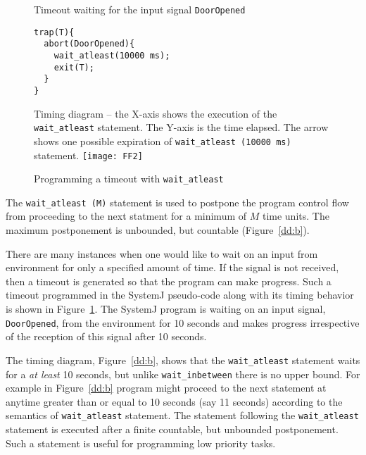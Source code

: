 \begin{figure}[b!]
	\centering
	\vspace{-10pt}
        \begin{SubFloat}{\label{dd:a}Timeout waiting for the input
            signal \texttt{DoorOpened}}
        \begin{lstlisting}[style=sysj,morekeywords={abort,await,emit,present,trap,pause,exit,wait_atleast,suspend}]
trap(T){
  abort(DoorOpened){
    wait_atleast(10000 ms);
    exit(T);  
  }
}
\end{lstlisting}
\end{SubFloat}
\begin{SubFloat}{\label{dd:b}Timing diagram -- the X-axis shows the
    execution of the \texttt{wait\_atleast} statement. The Y-axis is the
    time elapsed. The arrow shows one possible expiration of
    \texttt{wait\_atleast (10000 ms)} statement.}
\texttt{[image: FF2]}
\end{SubFloat}
\caption{Programming a timeout with \texttt{wait\_atleast}}
\label{dd}
\end{figure}

The \texttt{wait\_atleast (M)} statement is used to postpone the program
control flow from proceeding to the next statment for a minimum of $M$
time units. The maximum postponement is unbounded, but countable
(Figure~\ref{dd:b}).

There are many instances when one would like to wait on an input from
environment for only a specified amount of time. If the signal is not
received, then a timeout is generated so that the program can make
progress. Such a timeout programmed in the SystemJ pseudo-code along
with its timing behavior is shown in Figure~\ref{dd}. The SystemJ
program is waiting on an input signal, \texttt{DoorOpened}, from the
environment for 10 seconds and makes progress irrespective of the
reception of this signal after 10 seconds.

The timing diagram, Figure~\ref{dd:b}, shows that the
\texttt{wait\-\_atleast} statement waits for a \textit{at least} 10
seconds, but unlike \texttt{wait\_inbetween} there is no upper bound.
For example in Figure~\ref{dd:b} program might proceed to the next
statement at anytime greater than or equal to 10 seconds (say 11
seconds) according to the semantics of \texttt{wait\_atleast}
statement. The statement following the \texttt{wait\_atleast} statement
is executed after a finite countable, but unbounded postponement. Such a
statement is useful for programming low priority tasks.


